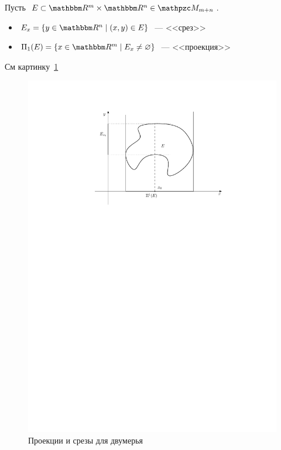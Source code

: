 \documentclass[draft, timbord]{longnotes}
\begin{document}
\begin{defn}\label{defn:meas::geomleb::proj}
  Пусть $E \subset \R^m \times \R^n \in \lebesgue_{m+n}$.
  \begin{itemize}[$\triangleright$]
    \item $E_x      = \{ y\in \R^n \mid (x,y) \in E\}$~--- <<срез>>
    \item $\Pi_1(E) = \{ x\in \R^m \mid E_x \neq \varnothing\}$~--- <<проекция>>
  \end{itemize}
\end{defn}

\begin{exmp}\label{exmp:meas::geomleb::planarproj}
  См картинку~\ref{fig:meas::geomleb::proj}

  \begin{figure}
  \begin{center}
    \includegraphics[scale=1]{meas/proj}
  \end{center}
  \caption{Проекции и срезы для двумерья}
  \label{fig:meas::geomleb::proj}
  \end{figure}
  
\end{exmp}
\end{document}
